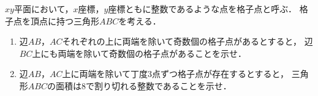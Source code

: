 \documentclass[../../main.tex]{subfiles}
\begin{document}
$xy$平面において，$x$座標，$y$座標ともに整数であるような点を格子点と呼ぶ．
格子点を頂点に持つ三角形$ABC$を考える．
\begin{enumerate}
  \item 辺$AB$，$AC$それぞれの上に両端を除いて奇数個の格子点があるとすると，
    辺$BC$上にも両端を除いて奇数個の格子点があることを示せ．
  \item 辺$AB$，$AC$上に両端を除いて丁度3点ずつ格子点が存在するとすると，
    三角形$ABC$の面積は8で割り切れる整数であることを示せ．
\end{enumerate}
\end{document}
